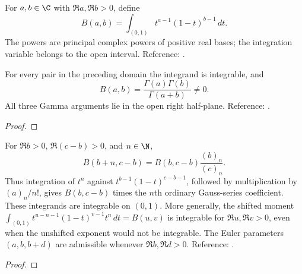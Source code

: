 \begin{supporting}
\begin{definition}
\label{def:euler-beta}
\leanok
For $a,b\in\C$ with $\Re a,\Re b>0$, define
\[
 B(a,b)=\int_{(0,1)} t^{a-1}(1-t)^{b-1}\,dt.
\]
The powers are principal complex powers of positive real bases; the integration
variable belongs to the open interval. Reference: \cite[5.12.1]{dlmf}.
\end{definition}

\begin{theorem}
\label{thm:euler-beta}
\leanok
For every pair in the preceding domain the integrand is integrable, and
\[
 B(a,b)=\frac{\Gamma(a)\Gamma(b)}{\Gamma(a+b)}\ne0.
\]
All three Gamma arguments lie in the open right half-plane.
Reference: \cite[5.12.1]{dlmf}.
\end{theorem}
\begin{proof}
\leanok
\end{proof}

\begin{theorem}
\label{thm:hypergeometric-beta-moments}
\leanok
For $\Re b>0$, $\Re(c-b)>0$, and $n\in\N$,
\[
 B(b+n,c-b)=B(b,c-b)\frac{(b)_n}{(c)_n}.
\]
Thus integration of $t^n$ against $t^{b-1}(1-t)^{c-b-1}$, followed by
multiplication by $(a)_n/n!$, gives $B(b,c-b)$ times the $n$th ordinary
Gauss-series coefficient.
These integrands are integrable on $(0,1)$. More generally, the shifted
moment $\int_{(0,1)}t^{u-n-1}(1-t)^{v-1}t^n\,dt=B(u,v)$ is integrable for
$\Re u,\Re v>0$, even when the unshifted exponent would not be integrable.
The Euler parameters $(a,b,b+d)$ are admissible whenever $\Re b,\Re d>0$.
Reference: \cite[5.12.1, 15.6.1]{dlmf}.
\end{theorem}
\begin{proof}
\leanok
\end{proof}


\end{supporting}
